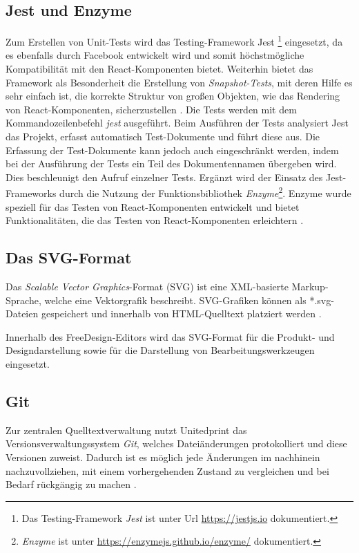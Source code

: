 \subsection{Jest und Enzyme}
Zum Erstellen von Unit-Tests wird das Testing-Framework Jest \footnote{Das Testing-Framework \emph{Jest} ist unter Url \url{https://jestjs.io} dokumentiert.} eingesetzt, da es ebenfalls durch Facebook entwickelt wird und somit höchstmögliche Kompatibilität mit den React-Komponenten bietet. Weiterhin bietet das Framework als Besonderheit die Erstellung von \emph{Snapshot-Tests}, mit deren Hilfe es sehr einfach ist, die korrekte Struktur von großen Objekten, wie das Rendering von React-Komponenten, sicherzustellen \autocite[vgl.][]{Facebook:JestIntroduction}.
Die Tests werden mit dem Kommandozeilenbefehl \emph{jest} ausgeführt.
Beim Ausführen der Tests analysiert Jest das Projekt,  erfasst automatisch Test-Dokumente und führt diese aus. 
Die Erfassung der Test-Dokumente kann jedoch auch eingeschränkt werden, indem bei der Ausführung der Tests ein Teil des Dokumentennamen übergeben wird. Dies beschleunigt den Aufruf einzelner Tests. 
Ergänzt wird der Einsatz des Jest-Frameworks durch die Nutzung der Funktionsbibliothek \emph{Enzyme}\footnote{\emph{Enzyme} ist unter \url{https://enzymejs.github.io/enzyme/} dokumentiert.}. Enzyme wurde speziell für das Testen von React-Komponenten entwickelt und bietet Funktionalitäten, die das Testen von React-Komponenten erleichtern \autocite[vgl.][]{Enzyme:Introduction}.

\subsection{Das SVG-Format}
Das \emph{Scalable Vector Graphics}-Format (SVG) ist eine XML-basierte Markup-Sprache, welche eine Vektorgrafik beschreibt. SVG-Grafiken können als *.svg-Dateien gespeichert und innerhalb von HTML-Quelltext platziert werden \autocite[vgl.][]{W3C:AboutSVG}. 

Innerhalb des FreeDesign-Editors wird das SVG-Format für die Produkt- und Designdarstellung sowie für die Darstellung von Bearbeitungswerkzeugen eingesetzt. 

\subsection{Git}
\label{chap:git}
Zur zentralen Quelltextverwaltung nutzt Unitedprint das Versionsverwaltungssystem \emph{Git}, welches Dateiänderungen protokolliert und diese Versionen zuweist. Dadurch ist es möglich jede Änderungen im nachhinein nachzuvollziehen, mit einem vorhergehenden Zustand zu vergleichen und bei Bedarf rückgängig zu machen \autocite[vgl.][]{Git:About}.

